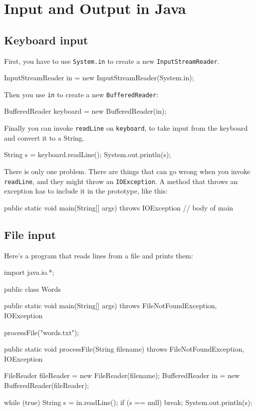 \chapter{Input and Output in Java}
\label{javaio}

\section{Keyboard input}
\label{keyboard}

First, you have to use {\tt System.in} to create a new
{\tt InputStreamReader}.

\begin{code}
    InputStreamReader in = new InputStreamReader(System.in);
\end{code}
%
Then you use {\tt in} to create a new {\tt BufferedReader}:

\begin{code}
    BufferedReader keyboard = new BufferedReader(in);
\end{code}
%
Finally you can invoke {\tt readLine} on {\tt keyboard},
to take input from the keyboard and convert it to a
String.

\begin{code}
    String s = keyboard.readLine();
    System.out.println(s);
\end{code}
%
There is only one problem.  There are things that can go wrong when
you invoke {\tt readLine}, and they might throw an {\tt IOException}.  A
method that throws an exception has to include it in the
prototype, like this:

\begin{code}
public static void main(String[] args) throws IOException {
    // body of main
}
\end{code}


\section{File input}
\label{fileIO}

Here's a program that reads lines from a file and prints them:

\begin{code}
import java.io.*;

public class Words {

    public static void main(String[] args)
        throws FileNotFoundException, IOException {

        processFile("words.txt");
    }

    public static void processFile(String filename)
        throws FileNotFoundException, IOException {

        FileReader fileReader = new FileReader(filename);
        BufferedReader in = new BufferedReader(fileReader);

        while (true) {
            String s = in.readLine();
            if (s == null) break;
            System.out.println(s);
        }
    }
}
\end{code}

